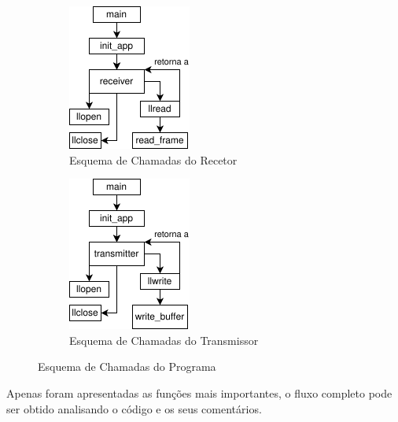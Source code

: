 \begin{figure}[h!]
    \centering
    \begin{subfigure}{.5\textwidth}
        \centering
        \includegraphics[width=.5\linewidth]{img/EsquemaChamadaAFuncoesReceiver.png}
        \caption{Esquema de Chamadas do Recetor}
    \end{subfigure}%
    \begin{subfigure}{.5\textwidth}
        \centering
        \includegraphics[width=.5\linewidth]{img/EsquemaChamadaAFuncoesTransmiter.png}
        \caption{Esquema de Chamadas do Transmissor}
    \end{subfigure}
    \caption{Esquema de Chamadas do Programa}
\end{figure}

Apenas foram apresentadas as funções mais importantes, o fluxo completo pode ser obtido analisando o código e os seus comentários.


